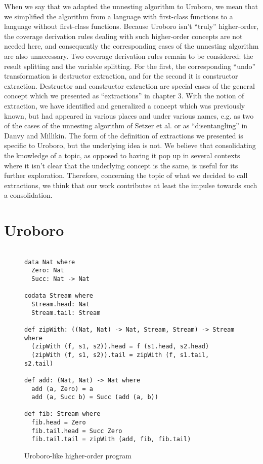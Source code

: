 When we say that we adapted the unnesting algorithm to Uroboro, we mean that we simplified the algorithm from a language with first-class functions to a language without first-class functions. Because Uroboro isn't ``truly'' higher-order, the coverage derivation rules dealing with such higher-order concepts are not needed here, and consequently the corresponding cases of the unnesting algorithm are also unnecessary. Two coverage derivation rules remain to be considered: the result splitting and the variable splitting. For the first, the corresponding ``undo'' transformation is destructor extraction, and for the second it is constructor extraction. Destructor and constructor extraction are special cases of the general concept which we presented as ``extractions'' in chapter 3. With the notion of extraction, we have identified and generalized a concept which was previously known, but had appeared in various places and under various names, e.g. as two of the cases of the unnesting algorithm of Setzer et al.\cite{setzer14unnesting} or as ``disentangling'' in Danvy and Millikin\cite{danvy09refunctionalization}. The form of the definition of extractions we presented is specific to Uroboro, but the underlying idea is not. We believe that consolidating the knowledge of a topic, as opposed to having it pop up in several contexts where it isn't clear that the underlying concept is the same, is useful for its further exploration. Therefore, concerning the topic of what we decided to call extractions, we think that our work contributes at least the impulse towards such a consolidation.

\section{Uroboro}
\label{sec:reluro}

\begin{figure}
\begin{lstlisting}
  
data Nat where
  Zero: Nat
  Succ: Nat -> Nat

codata Stream where
  Stream.head: Nat
  Stream.tail: Stream

def zipWith: ((Nat, Nat) -> Nat, Stream, Stream) -> Stream where
  (zipWith (f, s1, s2)).head = f (s1.head, s2.head)
  (zipWith (f, s1, s2)).tail = zipWith (f, s1.tail, s2.tail)

def add: (Nat, Nat) -> Nat where
  add (a, Zero) = a
  add (a, Succ b) = Succ (add (a, b))

def fib: Stream where
  fib.head = Zero
  fib.tail.head = Succ Zero
  fib.tail.tail = zipWith (add, fib, fib.tail)

\end{lstlisting}
\caption{Uroboro-like higher-order program}
\label{fig:ch5uro1}
\end{figure}


